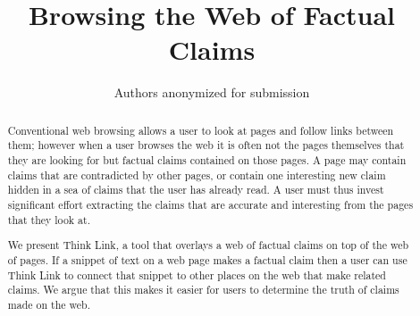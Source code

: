 \documentclass{chi2009}
\begin{document}
\setlength{\paperheight}{11in}
\setlength{\paperwidth}{8.5in}
\setlength{\pdfpageheight}{\paperheight}
\setlength{\pdfpagewidth}{\paperwidth}
%

\title{Browsing the Web of Factual Claims}


\author{
	\alignauthor Authors anonymized for submission
}


\sloppy 

\maketitle

\begin{abstract}

Conventional web browsing allows a user to look at pages and follow links between them; however when a user browses the web it is often not the pages themselves that they are looking for but  factual claims contained on those pages. A page may contain claims that are contradicted by other pages, or contain one interesting new claim hidden in a sea of claims that the user has already read. A user must thus invest significant effort extracting the claims that are accurate and interesting from the pages that they look at.

We present Think Link, a tool that overlays a web of factual claims on top of the web of pages. If a snippet of text on a web page makes a factual claim then a user can use Think Link to connect that snippet to other places on the web that make related claims. We argue that this makes it easier for users to determine the truth of claims made on the web.

\end{abstract}
\end{document}
